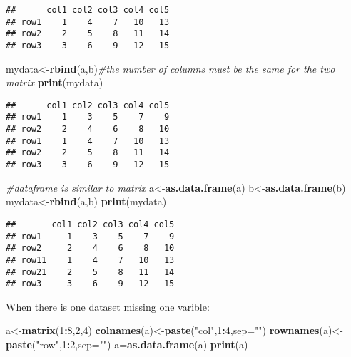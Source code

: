 \documentclass[]{book}
\newenvironment{Shaded}{\begin{snugshade}}{\end{snugshade}}
\newcommand{\KeywordTok}[1]{\textcolor[rgb]{0.13,0.29,0.53}{\textbf{#1}}}
\newcommand{\DataTypeTok}[1]{\textcolor[rgb]{0.13,0.29,0.53}{#1}}
\newcommand{\DecValTok}[1]{\textcolor[rgb]{0.00,0.00,0.81}{#1}}
\newcommand{\StringTok}[1]{\textcolor[rgb]{0.31,0.60,0.02}{#1}}
\newcommand{\CommentTok}[1]{\textcolor[rgb]{0.56,0.35,0.01}{\textit{#1}}}
\newcommand{\OperatorTok}[1]{\textcolor[rgb]{0.81,0.36,0.00}{\textbf{#1}}}
\newcommand{\NormalTok}[1]{#1}
\theoremstyle{definition}
\theoremstyle{definition}
\theoremstyle{definition}
\theoremstyle{remark}
\begin{document}
\begin{verbatim}
##      col1 col2 col3 col4 col5
## row1    1    4    7   10   13
## row2    2    5    8   11   14
## row3    3    6    9   12   15
\end{verbatim}

\begin{Shaded}
\begin{Highlighting}[]
\NormalTok{mydata<-}\KeywordTok{rbind}\NormalTok{(a,b)}\CommentTok{#the number of columns must be the same for the two matrix}
\KeywordTok{print}\NormalTok{(mydata)}
\end{Highlighting}
\end{Shaded}

\begin{verbatim}
##      col1 col2 col3 col4 col5
## row1    1    3    5    7    9
## row2    2    4    6    8   10
## row1    1    4    7   10   13
## row2    2    5    8   11   14
## row3    3    6    9   12   15
\end{verbatim}

\begin{Shaded}
\begin{Highlighting}[]
\CommentTok{#dataframe is similar to matrix}
\NormalTok{a<-}\KeywordTok{as.data.frame}\NormalTok{(a)}
\NormalTok{b<-}\KeywordTok{as.data.frame}\NormalTok{(b)}
\NormalTok{mydata<-}\KeywordTok{rbind}\NormalTok{(a,b)}
\KeywordTok{print}\NormalTok{(mydata)}
\end{Highlighting}
\end{Shaded}

\begin{verbatim}
##       col1 col2 col3 col4 col5
## row1     1    3    5    7    9
## row2     2    4    6    8   10
## row11    1    4    7   10   13
## row21    2    5    8   11   14
## row3     3    6    9   12   15
\end{verbatim}

When there is one dataset missing one varible:

\begin{Shaded}
\begin{Highlighting}[]
\NormalTok{a<-}\KeywordTok{matrix}\NormalTok{(}\DecValTok{1}\OperatorTok{:}\DecValTok{8}\NormalTok{,}\DecValTok{2}\NormalTok{,}\DecValTok{4}\NormalTok{)}
\KeywordTok{colnames}\NormalTok{(a)<-}\KeywordTok{paste}\NormalTok{(}\StringTok{"col"}\NormalTok{,}\DecValTok{1}\OperatorTok{:}\DecValTok{4}\NormalTok{,}\DataTypeTok{sep=}\StringTok{""}\NormalTok{)}
\KeywordTok{rownames}\NormalTok{(a)<-}\KeywordTok{paste}\NormalTok{(}\StringTok{"row"}\NormalTok{,}\DecValTok{1}\OperatorTok{:}\DecValTok{2}\NormalTok{,}\DataTypeTok{sep=}\StringTok{""}\NormalTok{)}
\NormalTok{a=}\KeywordTok{as.data.frame}\NormalTok{(a)}
\KeywordTok{print}\NormalTok{(a)}
\end{Highlighting}
\end{Shaded}
\end{document}

